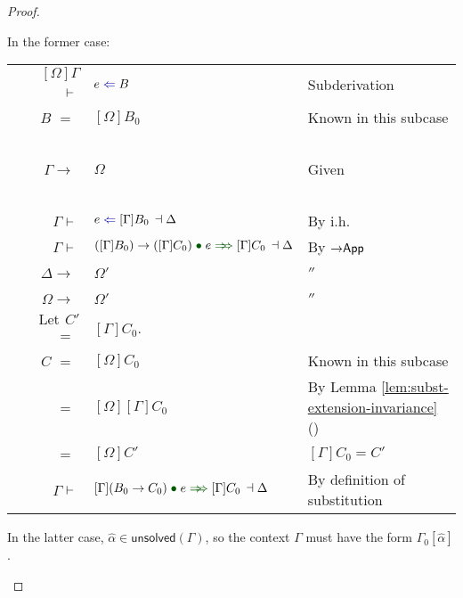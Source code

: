\documentclass[a4paper]{article}
\makeatletter
\newcommand{\mathcolor}[2]{\text{\textcolor{#1}{\ensuremath{#2}}}}
\newcommand{\arr}{\rightarrow}
\def\CompactJudgments{0}
\newcommand{\entails}{\mathrel{\ifnum\CompactJudgments=1\vdash \else \vdash\,\fi}}
\newcommand{\ctxoutsym}{\ifnum\CompactJudgments=1\dashv \else \,\dashv \fi}
\newcommand{\ctxout}[1]{\mathrel{\ctxoutsym}{#1}}
\newcommand{\Lemmaref}[1]{Lemma \ref{#1} (\nameref{#1})}   \newcommand{\Lemref}[1]{\Lemma \ref{#1}}   \newcommand{\Conjectureref}[1]{Conjecture \ref{#1}}
\newcommand{\BeginProof}{\renewcommand{\arraystretch}{1.1} \begin{tabular}[b]{r@{}r @{} l  l}}
\newcommand{\EndProof}{\end{tabular} \renewcommand{\arraystretch}{\mydefaultarraystretch}}
\newcommand{\Hand}{\text{\Pointinghand~~~~}}
\newcommand{\Pf}[4] {&$#1$ $#2$\, & $#3$ & #4 \\}
\newcommand{\Pfmrg}[3] {&$#1$\, & $#2$ & #3 \\}
\newcommand{\LetPf}[3] {\Pf{\text{Let}\,~{#1}}{=\,}{#2\text{.}}{#3}}
\newcommand{\mkpf}[4] {\Pf{#2}{#1\,}{#3}{#4}}
\newcommand{\eqPf}[3] {\mkpf{=}{#1}{#2}{#3}}
\newcommand{\continueeqPf}[2] {\mkpf{=}{~}{#1}{#2}}
\newcommand{\proofsep}{\,\\[-0.5em]}
\newenvironment{llproof}{\BeginProof}{\EndProof}
\newcommand{\ditto}{\ensuremath{''}}
\newcommand{\xunsolved}{\mathsf{unsolved}}
\newcommand{\unsolved}[1]{\xunsolved(#1)}
\newcommand{\substextendPf}[3] {\Pfmrg{{#1} \extendssym\,}{#2}{#3}}
\newcommand{\chkcolor}{dBlue}
\newcommand{\appcolor}{dDkGreen}
\newcommand{\chk}{\mathrel{\mathcolor{\chkcolor}{\Leftarrow}}}
\newcommand{\uncoloredsyn}{{\Rightarrow}}
\newcommand{\appsep}{\;{\mathcolor{\appcolor}{\bullet}}\;}
\newcommand{\app}{\mathrel{\mathcolor{\appcolor}{{\uncoloredsyn}\hspace{-1.2ex}{\uncoloredsyn}}}}
\newcommand{\chkjudgPf}[5]{\Pf{#1}{\entails}{{#2} \chk {#3} \ctxout{#4}}{#5}}
\newcommand{\appjudgPf}[6]{\Pf{#1}{\entails}{{#3} \appsep {#2} \app {#4} \ctxout{#5}}{#6}}
\newcommand{\declchkjudgPf}[4]{\Pf{#1}{\entails}{{#2} \chk {#3}}{#4}}
\newcommand{\extendssym}{\longrightarrow}
\newcommand{\ahat}{\hat{\alpha}}
\newcommand{\rulename}[1]{\text{\normalfont\textsf{#1}}}
\newcommand{\Tyrulename}[1]{\ensuremath{\rulename{#1}}\xspace}
\newcommand{\Apprulename}[1]{\Tyrulename{\ensuremath{#1}App}}
\newcommand{\ArrApp}{\Apprulename{\arr}}
\makeatother
\begin{document}
\begin{proof}
\begin{itemize}
          In the former case:

          \begin{llproof}
            \declchkjudgPf{[\Omega]\Gamma}{e}{B}  {Subderivation}
            \eqPf{B} {[\Omega]B_0}  {Known in this subcase}
            \proofsep
            \substextendPf{\Gamma}{\Omega}   {Given}
            \proofsep
            \chkjudgPf{\Gamma}{e}{[\Gamma]B_0}{\Delta}   {By i.h.}
            \appjudgPf{\Gamma}{e}{([\Gamma]B_0) \arr ([\Gamma]C_0)}{[\Gamma]C_0}{\Delta}  {By \ArrApp}
\Hand       \substextendPf{\Delta}{\Omega'}   {\ditto}
\Hand       \substextendPf{\Omega}{\Omega'}   {\ditto}
            \LetPf{C'} {[\Gamma]C_0}  {}
            \eqPf{C}{[\Omega]C_0}  {Known in this subcase}
            \continueeqPf {[\Omega][\Gamma]C_0}   {By \Lemmaref{lem:subst-extension-invariance}}
\Hand       \continueeqPf {[\Omega]C'}   {$[\Gamma]C_0 = C'$}
\Hand       \appjudgPf{\Gamma}{e}{[\Gamma](B_0 \arr C_0)}{[\Gamma]C_0}{\Delta}  {By definition of substitution}
          \end{llproof}
          
          In the latter case, $\ahat \in \unsolved{\Gamma}$,
          so the context $\Gamma$ must have the form $\Gamma_0[\ahat]$.
            

\end{itemize}
\end{proof}
\end{document}
